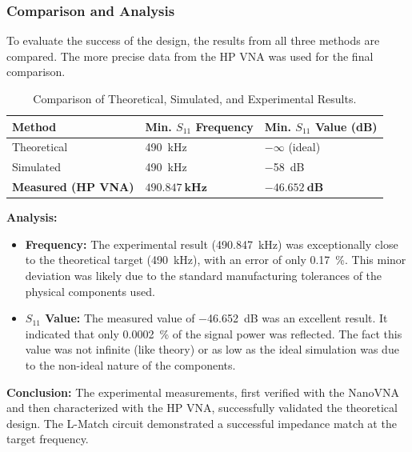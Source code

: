 \subsubsection{Comparison and Analysis}
To evaluate the success of the design, the results from all three methods are compared. The more precise data from the HP VNA was used for the final comparison.

\begin{table}[H]
    \centering
    \caption{Comparison of Theoretical, Simulated, and Experimental Results.}
    \label{tab:comparison}
    \begin{tabularx}{\textwidth}{ >{\centering\arraybackslash}X
                                  >{\centering\arraybackslash}X
                                  >{\centering\arraybackslash}X }
        \toprule
        \textbf{Method} & \textbf{Min. $S_{11}$ Frequency} & \textbf{Min. $S_{11}$ Value (dB)} \\
        \midrule
        Theoretical     & \SI{490}{\kilo\hertz}             & $-\infty$ (ideal)      \\
        \midrule
        Simulated       & \SI{490}{\kilo\hertz}             & \SI{-58}{\deci\bel}      \\
        \midrule
        \textbf{Measured (HP VNA)} & $\mathbf{\SI{490.847}{\kilo\hertz}}$ & $\mathbf{\SI{-46.652}{\deci\bel}}$     \\
        \bottomrule
    \end{tabularx}
\end{table}

\textbf{Analysis:}
\begin{itemize}
    \item \textbf{Frequency:} The experimental result (\SI{490.847}{\kilo\hertz}) was exceptionally close to the theoretical target (\SI{490}{\kilo\hertz}), with an error of only \SI{0.17}{\percent}. This minor deviation was likely due to the standard manufacturing tolerances of the physical components used.
    
    \item \textbf{$S_{11}$ Value:} The measured value of \SI{-46.652}{\deci\bel} was an excellent result. It indicated that only \SI{0.0002}{\percent} of the signal power was reflected. The fact this value was not infinite (like theory) or as low as the ideal simulation was due to the non-ideal nature of the components. 
\end{itemize}

\textbf{Conclusion:} The experimental measurements, first verified with the NanoVNA and then characterized with the HP VNA, successfully validated the theoretical design. The L-Match circuit demonstrated a successful impedance match at the target frequency.
